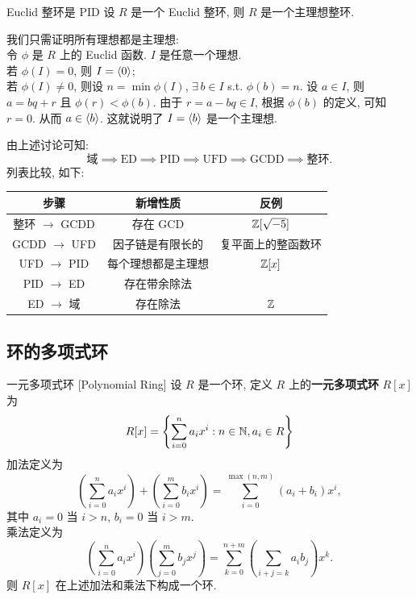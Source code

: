         \begin{thm}
            {Euclid 整环是 PID}
            设 \(R\) 是一个 Euclid 整环, 则 \(R\) 是一个主理想整环.
        \end{thm}

        \begin{prf}
            我们只需证明所有理想都是主理想:\\
            令 \(\phi\) 是 \(R\) 上的 Euclid 函数. \(I\) 是任意一个理想. \\
            若 \(\phi(I)=0\), 则 \(I=\expval{0}\);\\
            若 \(\phi(I)\neq 0\), 则设 \(n=\min \phi(I)\), \(\exists\,b\in I\) s.t. \(\phi(b)=n\). 设 \(a\in I\), 则 \(a=bq+r\) 且 \(\phi(r)<\phi(b)\). 由于 \(r=a-bq\in I\), 根据 \(\phi(b)\) 的定义, 可知 \(r=0\). 从而 \(a\in \expval{b}\). 这就说明了 \(I=\expval{b}\) 是一个主理想.
        \end{prf}
        
        \begin{rmk}
            由上述讨论可知:
            \[\text{域}\implies \text{ED} \implies \text{PID}\implies \text{UFD}\implies \text{GCDD}\implies\text{整环}. \]
            列表比较, 如下:
            \begin{center}
            \begin{tabular}{c|c|c}
                \toprule
                步骤 & 新增性质 & 反例 \\
                \midrule
                整环 \(\to\) GCDD & 存在 GCD & \(\operatorname{\mathbb{Z}}[\sqrt{-5}]\) \\
                GCDD \(\to\) UFD & 因子链是有限长的 & 复平面上的整函数环 \\
                UFD \(\to\) PID & 每个理想都是主理想 & \(\operatorname{\mathbb{Z}}[x]\) \\
                PID \(\to\) ED & 存在带余除法 &  \\
                ED \(\to\) 域 & 存在除法 & \(\operatorname{\mathbb{Z}}\) \\
                \bottomrule
            \end{tabular}
            \end{center}
        \end{rmk}

    \subsection{环的多项式环}

        \begin{dfn}
            {一元多项式环}
            [Polynomial Ring]
            设 \(R\) 是一个环, 定义 \(R\) 上的\textbf{一元多项式环} \(R[x]\) 为
            \[R[x]=\left\{\sum_{i=0}^{n} a_i x^i: n\in\operatorname{\mathbb{N}}, a_i\in R\right\}\]
            加法定义为
            \[\left(\sum_{i=0}^{n} a_i x^i\right)+\left(\sum_{i=0}^{m} b_i x^i\right)=\sum_{i=0}^{\max(n,m)} (a_i+b_i)x^i,\]
            其中 \(a_i=0\) 当 \(i>n\), \(b_i=0\) 当 \(i>m\).\\
            乘法定义为
            \[\left(\sum_{i=0}^{n} a_i x^i\right)\left(\sum_{j=0}^{m} b_j x^j\right)=\sum_{k=0}^{n+m}\left(\sum_{i+j=k} a_i b_j \right)x^k.\]
            则 \(R[x]\) 在上述加法和乘法下构成一个环.
        \end{dfn}

